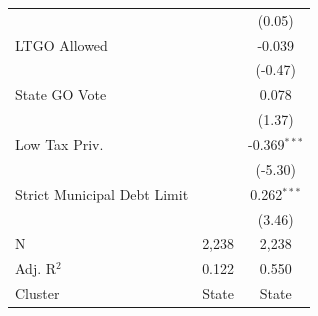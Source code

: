 \begin{tabular*}{\textwidth}{@{\extracolsep{\fill}}lcc}
                               &               & (0.05)\\   
   LTGO Allowed                &               & -0.039\\   
                               &               & (-0.47)\\   
   State GO Vote               &               & 0.078\\   
                               &               & (1.37)\\   
   Low Tax Priv.               &               & -0.369$^{***}$\\   
                               &               & (-5.30)\\   
   Strict Municipal Debt Limit &               & 0.262$^{***}$\\   
                               &               & (3.46)\\   
   \hline
   N                & 2,238         & 2,238\\  
   Adj. R$^2$              & 0.122         & 0.550\\  
   Cluster              & State & State\\  
   \bottomrule
\end{tabular*}
\par\endgroup
